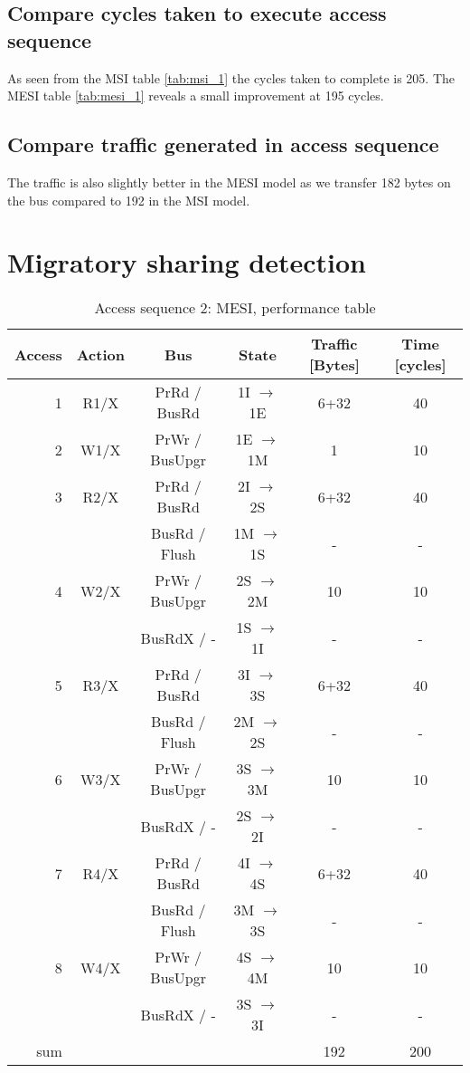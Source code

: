 \documentclass[a4paper,10pt]{article}
\begin{document}
\subsection{Compare cycles taken to execute access sequence}
As seen from the MSI table \ref{tab:msi_1} the cycles taken to complete is 205.
The MESI table \ref{tab:mesi_1} reveals a small improvement at 195 cycles.

\subsection{Compare traffic generated in access sequence}
The traffic is also slightly better in the MESI model as we transfer 182 bytes on the bus compared to 192 in the MSI model.


\newpage

\section{Migratory sharing detection}

\begin{table}[h!]
  \centering
  \begin{tabular}{rccccc}
    Access & Action & Bus & State & Traffic [Bytes] & Time [cycles] \\ \hline
     1 & R1/X & PrRd / BusRd & 1I $\rightarrow$ 1E  & 6+32 & 40 \\
     2 & W1/X & PrWr / BusUpgr & 1E $\rightarrow$ 1M & 1 & 10 \\

     3 & R2/X & PrRd / BusRd & 2I $\rightarrow$ 2S  & 6+32 & 40 \\
       &      & BusRd / Flush & 1M $\rightarrow$ 1S & - & - \\
     4 & W2/X & PrWr / BusUpgr & 2S $\rightarrow$ 2M & 10 & 10 \\
       &      & BusRdX / - & 1S $\rightarrow$ 1I & - & - \\

     5 & R3/X & PrRd / BusRd & 3I $\rightarrow$ 3S  & 6+32 & 40 \\
       &      & BusRd / Flush & 2M $\rightarrow$ 2S & - & - \\
     6 & W3/X & PrWr / BusUpgr & 3S $\rightarrow$ 3M & 10 & 10 \\
       &      & BusRdX / - & 2S $\rightarrow$ 2I & - & - \\

     7 & R4/X & PrRd / BusRd & 4I $\rightarrow$ 4S  & 6+32 & 40 \\
       &      & BusRd / Flush & 3M $\rightarrow$ 3S & - & - \\
     8 & W4/X & PrWr / BusUpgr & 4S $\rightarrow$ 4M & 10 & 10 \\
       &      & BusRdX / - & 3S $\rightarrow$ 3I & - & - \\ \hline

    sum & & & & 192 & 200 \\ \hline \hline
  \end{tabular}
  \caption{Access sequence 2: MESI, performance table}
  \label{tab:mesi_2}
\end{table}
\end{document}
